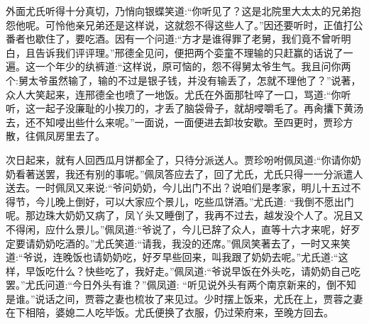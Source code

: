 \begin{parag}
    外面尤氏听得十分真切，乃悄向银蝶笑道:“你听见了？这是北院里大太太的兄弟抱怨他呢。可怜他亲兄弟还是这样说，这就怨不得这些人了。”因还要听时，正值打公番者也歇住了，要吃酒。因有一个问道:“方才是谁得罪了老舅，我们竟不曾听明白，且告诉我们评评理。”邢德全见问，便把两个娈童不理输的只赶赢的话说了一遍。这一个年少的纨裤道:“这样说，原可恼的，怨不得舅太爷生气。我且问你两个:舅太爷虽然输了，输的不过是银子钱，并没有输丢了，怎就不理他了？”说著，众人大笑起来，连邢德全也喷了一地饭。尤氏在外面那牡啐了一口，骂道:“你听听，这一起子没廉耻的小挨刀的，才丢了脑袋骨子，就胡唚嚼毛了。再肏攮下黄汤去，还不知唚出些什么来呢。”一面说，一面便进去卸妆安歇。至四更时，贾珍方散，往佩凤房里去了。
\end{parag}


\begin{parag}
    次日起来，就有人回西瓜月饼都全了，只待分派送人。贾珍吩咐佩凤道:“你请你奶奶看著送罢，我还有别的事呢。”佩凤答应去了，回了尤氏，尤氏只得一一分派遣人送去。一时佩凤又来说:“爷问奶奶，今儿出门不出？说咱们是孝家，明儿十五过不得节，今儿晚上倒好，可以大家应个景儿，吃些瓜饼酒。”尤氏道: “我倒不愿出门呢。那边珠大奶奶又病了，凤丫头又睡倒了，我再不过去，越发没个人了。况且又不得闲，应什么景儿。”佩凤道:“爷说了，今儿已辞了众人，直等十六才来呢，好歹定要请奶奶吃酒的。”尤氏笑道:“请我，我没的还席。”佩凤笑著去了，一时又来笑道:“爷说，连晚饭也请奶奶吃，好歹早些回来，叫我跟了奶奶去呢。”尤氏道:“这样，早饭吃什么？快些吃了，我好走。”佩凤道:“爷说早饭在外头吃，请奶奶自己吃罢。”尤氏问道:“今日外头有谁？”佩凤道: “听见说外头有两个南京新来的，倒不知是谁。”说话之间，贾蓉之妻也梳妆了来见过。少时摆上饭来，尤氏在上，贾蓉之妻在下相陪，婆媳二人吃毕饭。尤氏便换了衣服，仍过荣府来，至晚方回去。
\end{parag}


